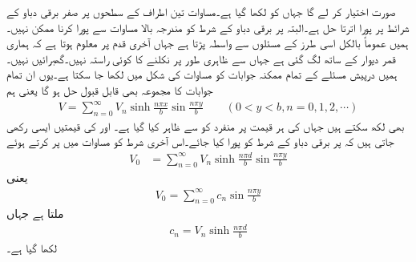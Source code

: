 صورت اختیار کر لے  گا جہاں  کو  لکھا گیا ہے۔مساوات  تین اطراف کے سطحوں پر صفر برقی دباو کے شرائط پر پورا اترتا حل ہے۔البتہ  پر  برقی دباو کے شرط کو مندرجہ بالا مساوات سے پورا کرنا ممکن نہیں۔ہمیں عموماً بالکل اسی طرز کے مسئلوں سے واسطہ پڑتا ہے جہاں آخری قدم پر معلوم ہوتا ہے کہ ہماری قمر دیوار کے ساتھ لگ گئی ہے جہاں سے ظاہری طور پر نکلنے کا کوئی راستہ نہیں۔گھبرائیں نہیں۔ہمیں درپیش مسئلے کے تمام ممکنہ جوابات کو مساوات  کی شکل میں لکھا جا سکتا ہے۔یوں ان تمام جوابات کا مجموعہ بھی قابل قبول حل ہو گا یعنی ہم 
\begin{align}\label{مساوات_لاپلاس_فوریئر_تسلسل_کا_حل}
V=\sum_{n=0}^{\infty} V_{n} \sinh \frac{n\pi x}{b} \sin \frac{n\pi y}{b} \quad \quad (0<y<b,n=0,1,2,\cdots)
\end{align}
بھی لکھ سکتے ہیں جہاں   کی ہر قیمت پر منفرد   کو  سے ظاہر کیا گیا ہے۔  اور  کی قیمتیں ایسی رکھی جاتی ہیں کہ   پر  برقی دباو کے شرط کو پورا کیا جائے۔اس آخری شرط کو مساوات میں پر کرتے ہوئے
\begin{align*}
V_0&=\sum_{n=0}^{\infty} V_{n} \sinh \frac{n\pi d}{b} \sin \frac{n\pi y}{b}
\end{align*}
یعنی
\begin{align}\label{مساوات_لاپلاس_فوریئر_تسلسل_حل}
V_0=\sum_{n=0}^{\infty} c_n\sin \frac{n\pi y}{b}
\end{align}
ملتا ہے جہاں 
\begin{align*}
c_n=V_n \sinh \frac{n\pi d}{b}
\end{align*}
لکھا گیا ہے۔

